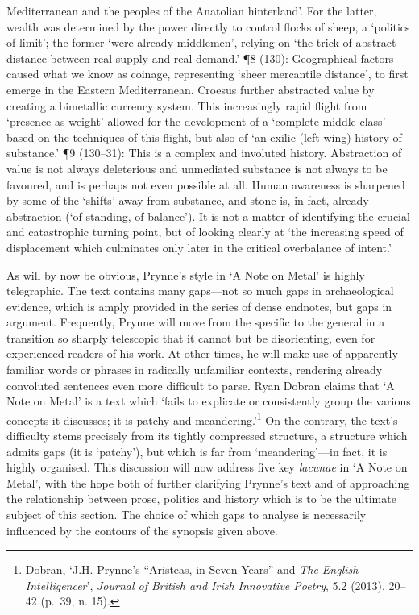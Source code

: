 \documentclass[]{article}
\begin{document}
Mediterranean and the peoples of the Anatolian hinterland’. For the
latter, wealth was determined by the power directly to control flocks of
sheep, a ‘politics of limit’; the former ‘were already middlemen’,
relying on ‘the trick of abstract distance between real supply and real
demand.’ ¶8 (130): Geographical factors caused what we know as coinage,
representing ‘sheer mercantile distance’, to first emerge in the Eastern
Mediterranean. Croesus further abstracted value by creating a bimetallic
currency system. This increasingly rapid flight from ‘presence as
weight’ allowed for the development of a ‘complete middle class’ based
on the techniques of this flight, but also of ‘an exilic (left-wing)
history of substance.’ ¶9 (130–31): This is a complex and involuted
history. Abstraction of value is not always deleterious and unmediated
substance is not always to be favoured, and is perhaps not even possible
at all. Human awareness is sharpened by some of the ‘shifts’ away from
substance, and stone is, in fact, already abstraction (‘of standing, of
balance’). It is not a matter of identifying the crucial and
catastrophic turning point, but of looking clearly at ‘the increasing
speed of displacement which culminates only later in the critical
overbalance of intent.’

As will by now be obvious, Prynne’s style in ‘A Note on Metal’ is highly
telegraphic. The text contains many gaps—not so much gaps in
archaeological evidence, which is amply provided in the series of dense
endnotes, but gaps in argument. Frequently, Prynne will move from the
specific to the general in a transition so sharply telescopic that it
cannot but be disorienting, even for experienced readers of his work. At
other times, he will make use of apparently familiar words or phrases in
radically unfamiliar contexts, rendering already convoluted sentences
even more difficult to parse. Ryan Dobran claims that ‘A Note on Metal’
is a text which ‘fails to explicate or consistently group the various
concepts it discusses; it is patchy and meandering.’\footnote{Dobran,
  ‘J.H. Prynne’s “Aristeas, in Seven Years” and \emph{The English
  Intelligencer}’, \emph{Journal of British and Irish Innovative
  Poetry}, 5.2 (2013), 20–42 (p.~39, n. 15).} On the contrary, the
text’s difficulty stems precisely from its tightly compressed structure,
a structure which admits gaps (it is ‘patchy’), but which is far from
‘meandering’—in fact, it is highly organised. This discussion will now
address five key \emph{lacunae} in ‘A Note on Metal’, with the hope both
of further clarifying Prynne’s text and of approaching the relationship
between prose, politics and history which is to be the ultimate subject
of this section. The choice of which gaps to analyse is necessarily
influenced by the contours of the synopsis given above.
\end{document}
